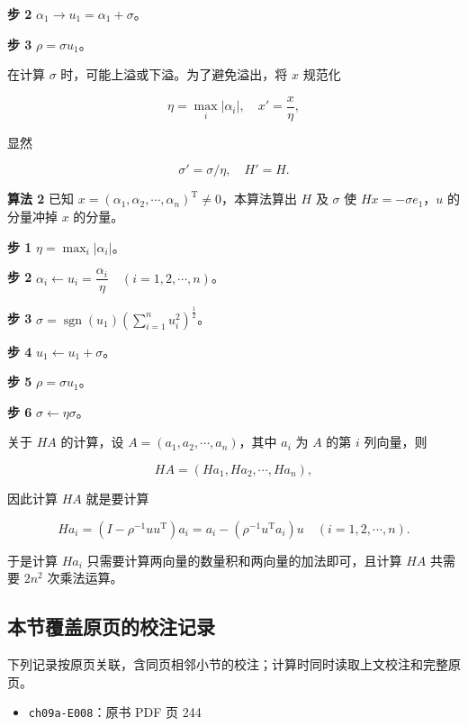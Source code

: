 \documentclass[
  10pt,
  fontset=fandol]{ctexart}
\providecommand{\tightlist}{%
  \setlength{\itemsep}{0pt}\setlength{\parskip}{0pt}}
\begin{document}
\textbf{步 2} \(\alpha_1\to u_1=\alpha_1+\sigma\)。

\textbf{步 3} \(\rho=\sigma u_1\)。

在计算 \(\sigma\) 时，可能上溢或下溢。为了避免溢出，将 \(x\) 规范化

\[
\eta=\max_i|\alpha_i|,\quad x'=\frac{x}{\eta},
\]

显然

\[
\sigma'=\sigma/\eta,\quad H'=H.
\]

\textbf{算法 2} 已知 \(x=(\alpha_1,\alpha_2,\cdots,\alpha_n)^{\mathrm T}\ne0\)，本算法算出 \(H\) 及 \(\sigma\) 使 \(Hx=-\sigma e_1\)，\(u\) 的分量冲掉 \(x\) 的分量。

\textbf{步 1} \(\eta=\max_i|\alpha_i|\)。

\textbf{步 2} \(\alpha_i\leftarrow u_i=\dfrac{\alpha_i}{\eta}\quad(i=1,2,\cdots,n)\)。

\textbf{步 3} \(\sigma=\operatorname{sgn}(u_1)\left(\displaystyle\sum_{i=1}^nu_i^2\right)^{\frac12}\)。

\textbf{步 4} \(u_1\leftarrow u_1+\sigma\)。

\textbf{步 5} \(\rho=\sigma u_1\)。

\textbf{步 6} \(\sigma\leftarrow\eta\sigma\)。

关于 \(HA\) 的计算，设 \(A=(a_1,a_2,\cdots,a_n)\)，其中 \(a_i\) 为 \(A\) 的第 \(i\) 列向量，则

\[
HA=(Ha_1,Ha_2,\cdots,Ha_n),
\]

因此计算 \(HA\) 就是要计算

\[
Ha_i=(I-\rho^{-1}uu^{\mathrm T})a_i=a_i-(\rho^{-1}u^{\mathrm T}a_i)u\quad(i=1,2,\cdots,n).
\]

于是计算 \(Ha_i\) 只需要计算两向量的数量积和两向量的加法即可，且计算 \(HA\) 共需要 \(2n^2\) 次乘法运算。

\subsection{本节覆盖原页的校注记录}\label{ux672cux8282ux8986ux76d6ux539fux9875ux7684ux6821ux6ce8ux8bb0ux5f55}

下列记录按原页关联，含同页相邻小节的校注；计算时同时读取上文校注和完整原页。

\begin{itemize}
\tightlist
\item
  \texttt{ch09a-E008}：原书 PDF 页 244
\end{itemize}
\end{document}
